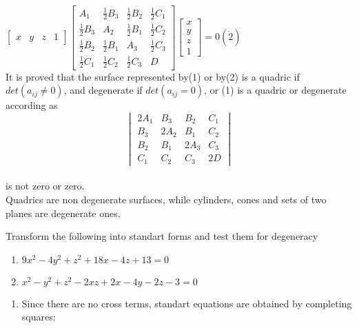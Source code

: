 \documentclass[12pt,a4paper]{article}
\begin{document}
   $ \begin{bmatrix} 
       x & y & z & 1 
    \end{bmatrix}
    \begin{bmatrix}
        A_1  & \frac{1}{2} B_3 & \frac{1}{2} B_2 & \frac{1}{2} C_1\\
        \frac{1}{2} B_3 & A_2 & \frac{1}{2} B_1 & \frac{1}{2} C_2\\
        \frac{1}{2} B_2 & \frac{1}{2} B_1 & A_3 & \frac{1}{2} C_3\\
        \frac{1}{2} C_1 & \frac{1}{2} C_2 & \frac{1}{2} C_3 & D
    \end{bmatrix}
    \begin{bmatrix}
        x\\
        y\\
        z\\
        1
    \end{bmatrix}=0(\dot 2)
    $\\
    It is proved that the surface represented by(1) or by(2) is a quadric if $det(a_{ij}\neq 0)$, and degenerate if $det(a_{ij}=0)$, or (1) is a quadric or degenerate according as
    $$\begin{vmatrix}
        2A_1 & B_3 & B_2 & C_1\\
        B_3 & 2A_2 & B_1 & C_2\\
        B_2 & B_1 & 2A_3 & C_3\\
        C_1 & C_2 & C_3 & 2D 
    \end{vmatrix}$$\\
    is not zero or zero.\\
    Quadrics are non degenerate surfaces, while cylinders, cones and sets of two planes are degenerate ones.\\
    \begin{exmp}
        Transform the following into standart forms and test them for degeneracy
        \begin{enumerate}[label=(\alph*)]
            \item $9x^2-4y^2+z^2+18x-4z+13=0$
            \item $x^2-y^2+z^2-2xz+2x-4y-2z-3=0$
        \end{enumerate}
    \end{exmp}
    \begin{hSolution}
        \begin{enumerate}[label=(\alph*)]
            \item Since there are no cross terms, standart equations are obtained by completing squares:
        \end{enumerate}
    \end{hSolution}
\end{document}
